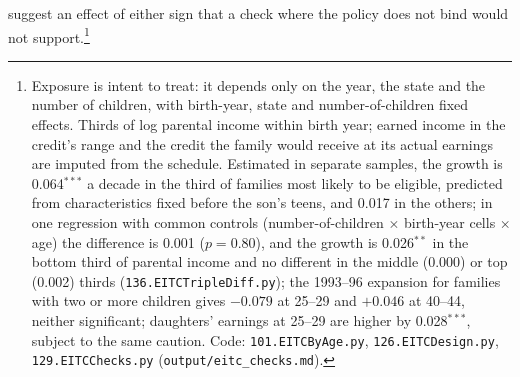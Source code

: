suggest an effect of either sign that a check where the policy does not bind would not support.\footnote{Exposure is
intent to treat: it depends only on the year, the state and the number of children, with birth-year, state and
number-of-children fixed effects. Thirds of log parental income within birth year; earned income in the credit's range
and the credit the family would receive at its actual earnings are imputed from the schedule. Estimated in separate samples, the growth
is 0.064$^{***}$ a decade in the third of families most likely to be eligible, predicted from characteristics fixed
before the son's teens, and 0.017 in the others; in one regression with common controls (number-of-children
$\times$ birth-year cells $\times$ age) the difference is 0.001 ($p = 0.80$), and the growth is 0.026$^{**}$ in the
bottom third of parental income and no different in the middle (0.000) or top (0.002) thirds
(\texttt{136.EITCTripleDiff.py}); the 1993--96 expansion for families with two or more children
gives $-0.079$ at 25--29 and $+0.046$ at 40--44, neither significant; daughters' earnings at 25--29 are higher by
0.028$^{***}$, subject to the same caution. Code: \texttt{101.EITCByAge.py}, \texttt{126.EITCDesign.py},
\texttt{129.EITCChecks.py} (\texttt{output/eitc\_checks.md}).}


